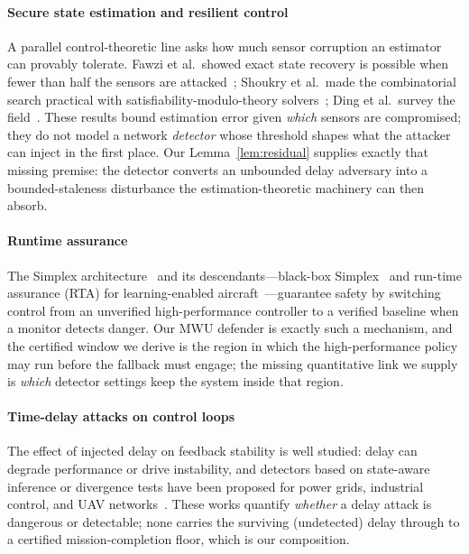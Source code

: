 \documentclass[conference]{IEEEtran}
\begin{document}
\paragraph{Secure state estimation and resilient control}
A parallel control-theoretic line asks how much sensor corruption an estimator
can provably tolerate. Fawzi et al.\ showed exact state recovery is possible
when fewer than half the sensors are attacked~\cite{fawzi2014secure}; Shoukry
et al.\ made the combinatorial search practical with satisfiability-modulo-theory
solvers~\cite{shoukry2017smt}; Ding et al.\ survey the field~\cite{ding2021survey}.
These results bound estimation error given \emph{which} sensors are compromised;
they do not model a network \emph{detector} whose threshold shapes what the
attacker can inject in the first place. Our Lemma~\ref{lem:residual} supplies
exactly that missing premise: the detector converts an unbounded delay adversary
into a bounded-staleness disturbance the estimation-theoretic machinery can then
absorb.

\paragraph{Runtime assurance}
The Simplex architecture~\cite{sha2001simplex} and its descendants---black-box
Simplex~\cite{mehmood2022blackbox} and run-time assurance (RTA) for
learning-enabled aircraft~\cite{cofer2020rta}---guarantee safety by switching
control from an unverified high-performance controller to a verified baseline
when a monitor detects danger. Our MWU defender is exactly such a mechanism, and
the certified window we derive is the region in which the high-performance
policy may run before the fallback must engage; the missing quantitative link we
supply is \emph{which} detector settings keep the system inside that region.

\paragraph{Time-delay attacks on control loops}
The effect of injected delay on feedback stability is well studied: delay can
degrade performance or drive instability, and detectors based on state-aware
inference or divergence tests have been proposed for power grids, industrial
control, and UAV networks~\cite{lou2019timedelay,etd2023uav,datamut2026}. These
works quantify \emph{whether} a delay attack is dangerous or detectable; none
carries the surviving (undetected) delay through to a certified
mission-completion floor, which is our composition.
\end{document}

